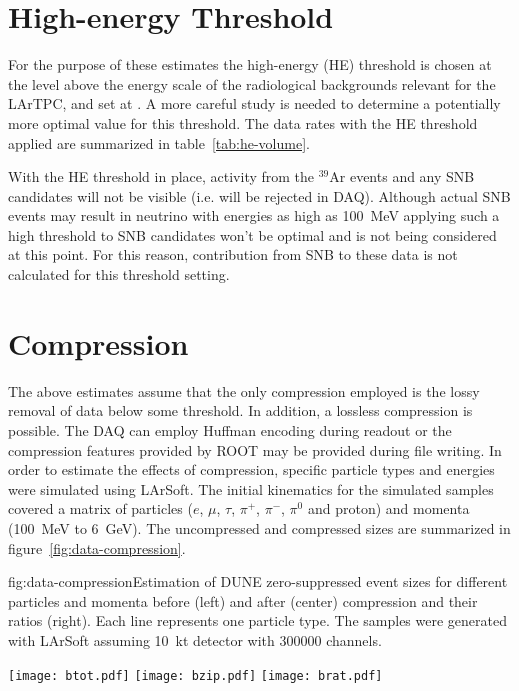 \section{High-energy Threshold}

For the purpose of these estimates the  high-energy (HE) threshold is chosen at the level above 
the energy scale of the radiological backgrounds relevant for the LArTPC, and set at  \chargehethreshold.
A more careful study is needed to determine a potentially more optimal value for this threshold.
The data rates with the HE threshold applied are summarized in table~\ref{tab:he-volume}.



With the HE threshold in place, activity from the $^{39}$Ar events and any SNB
candidates will not be visible (i.e. will be rejected in DAQ).
Although actual SNB events may result in neutrino with energies as high as
\SI{100}{\MeV} applying such a high threshold to SNB candidates won't be optimal and is not being considered at this point.
For this reason, contribution from SNB to these data is not calculated for this threshold setting.


\section{Compression}

The above estimates assume that the only compression employed is the
lossy removal of data below some threshold.
In addition, a lossless compression is possible.
The DAQ can employ Huffman encoding during readout or the compression
features provided by ROOT may be provided during file writing.
In order to estimate the effects of compression, specific particle
types and energies were simulated using LArSoft.
The initial kinematics for the simulated samples covered a matrix of
particles ($e$, $\mu$, $\tau$, $\pi^+$, $\pi^-$, $\pi^0$ and proton) and momenta
(\SI{100}{\MeV} to \SI{6}{\GeV}).
The uncompressed and compressed sizes are summarized in figure~\ref{fig:data-compression}.

\begin{cdrfigure}{fig:data-compression}{Estimation of DUNE zero-suppressed event sizes for
    different particles and momenta before (left) and after (center)
    compression and their ratios (right).
    Each line represents one particle type.
    The samples were generated with LArSoft assuming
    \SI{10}{\kilo\tonne} detector with \num{300000} channels.}

  \texttt{[image: btot.pdf]}
  \texttt{[image: bzip.pdf]}
  \texttt{[image: brat.pdf]}

\end{cdrfigure}

